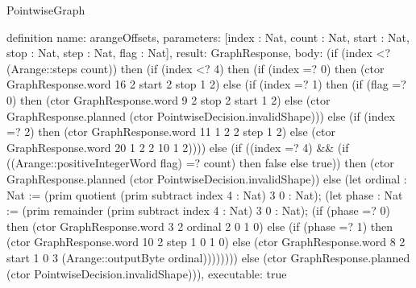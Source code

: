 \begin{lexlean}{PointwiseGraph}
\begin{semanticmodule}
definition{
  name: arangeOffsets,
  parameters: [index : Nat, count : Nat, start : Nat, stop : Nat, step : Nat, flag : Nat],
  result: GraphResponse,
  body: (if (index <? (Arange::steps count)) then (if (index <? 4) then (if (index =? 0) then (ctor GraphResponse.word 16 2 start 2 stop 1 2) else (if (index =? 1) then (if (flag =? 0) then (ctor GraphResponse.word 9 2 stop 2 start 1 2) else (ctor GraphResponse.planned (ctor PointwiseDecision.invalidShape))) else (if (index =? 2) then (ctor GraphResponse.word 11 1 2 2 step 1 2) else (ctor GraphResponse.word 20 1 2 2 10 1 2)))) else (if ((index =? 4) && (if ((Arange::positiveIntegerWord flag) =? count) then false else true)) then (ctor GraphResponse.planned (ctor PointwiseDecision.invalidShape)) else (let ordinal : Nat := (prim quotient (prim subtract index 4 : Nat) 3 0 : Nat); (let phase : Nat := (prim remainder (prim subtract index 4 : Nat) 3 0 : Nat); (if (phase =? 0) then (ctor GraphResponse.word 3 2 ordinal 2 0 1 0) else (if (phase =? 1) then (ctor GraphResponse.word 10 2 step 1 0 1 0) else (ctor GraphResponse.word 8 2 start 1 0 3 (Arange::outputByte ordinal)))))))) else (ctor GraphResponse.planned (ctor PointwiseDecision.invalidShape))),
  executable: true
}


\end{semanticmodule}
\end{lexlean}
